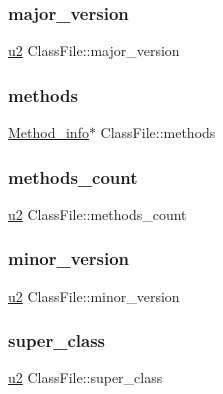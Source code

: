 \subsubsection{\texorpdfstring{major\+\_\+version}{major\_version}}
{\footnotesize\ttfamily \hyperlink{util_8h_a55ef8d87fd202b8417704c089899c5b9}{u2} Class\+File\+::major\+\_\+version}

\mbox{\label{struct_class_file_a5906980e6c5121e5a864346fd3617083}} 
\subsubsection{\texorpdfstring{methods}{methods}}
{\footnotesize\ttfamily \hyperlink{struct_method__info}{Method\+\_\+info}$\ast$ Class\+File\+::methods}

\mbox{\label{struct_class_file_aacfb45d4af64216324b1ae5269c870d5}} 
\subsubsection{\texorpdfstring{methods\+\_\+count}{methods\_count}}
{\footnotesize\ttfamily \hyperlink{util_8h_a55ef8d87fd202b8417704c089899c5b9}{u2} Class\+File\+::methods\+\_\+count}

\mbox{\label{struct_class_file_af0db7b0ea01cb9cea2cee177ca81df09}} 
\subsubsection{\texorpdfstring{minor\+\_\+version}{minor\_version}}
{\footnotesize\ttfamily \hyperlink{util_8h_a55ef8d87fd202b8417704c089899c5b9}{u2} Class\+File\+::minor\+\_\+version}

\mbox{\label{struct_class_file_a5f6c11c0ccb02fd992b5c102725253ec}} 
\subsubsection{\texorpdfstring{super\+\_\+class}{super\_class}}
{\footnotesize\ttfamily \hyperlink{util_8h_a55ef8d87fd202b8417704c089899c5b9}{u2} Class\+File\+::super\+\_\+class}

